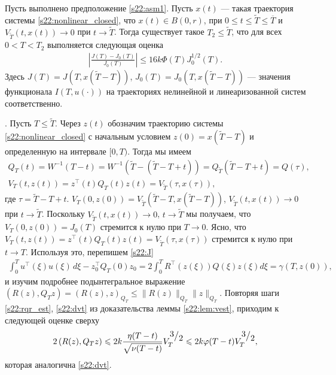 \documentclass[../main.tex]{subfiles}
\begin{document}
\begin{theorem}\label{s22:th:functional_error_estimate}
 Пусть выполнено предположение \ref{s22:asm1}. 
Пусть $x(t)$ --- такая траектория системы \eqref{s22:nonlinear_closed}, что $x(t)\in B(0,r)$, при $0\leqslant t \leqslant \tilde{T} \leqslant \overline{T} $ и $V_{\tilde{T}}(t,x(t))\to 0$ при $t\to \tilde{T}$. 
 Тогда существует такое $T_2 \leqslant \tilde{T}$, что для всех $0 < T < T_2 $ выполняется следующая оценка
 \begin{gather} \label{s22:est}
 \left| \frac{ J(T) - J_0(T)}{J_0(T)}\right| \leqslant 16k\Phi({T})J^{1/2}_0(T).
 \end{gather}
 Здесь $J(T)=J(T,x(\tilde{T}-T))$, $J_0(T)=J_0(T,x(\tilde{T}-T))$ --- значения функционала $I(T,u(\cdot))$ на траекториях нелинейной и линеаризованной систем соответственно.
\end{theorem}
\doc. 
Пусть $T\leqslant \tilde{T}$. 
Через $z(t)$ обозначим траекторию системы \eqref{s22:nonlinear_closed} с начальным условием $z(0)=x(\tilde{T}-T)$ и определенную на интервале $[0,T)$. 
Тогда мы имеем 
\begin{gather*}
Q_T(t)=W^{-1}(T-t)=W^{-1}(\tilde{T}-(\tilde{T}-T+t))=Q_{\tilde{T}}(\tilde{T}-T+t) = Q(\tau), \\ V_T(t,z(t))=z^\top(t)Q_T(t)z(t)=V_{\tilde{T}}(\tau,x(\tau)),
\end{gather*}
где $\tau=\tilde{T}-T+t$. 
$V_T(0,z(0))=V_{\tilde{T}}(\tilde{T}-T, x(\tilde{T}-T))$, $V_{\tilde{T}}(t,x(t))\to 0$ при $t\to \tilde{T}$. 
Поскольку $V_{\tilde{T}}(t,x(t))\to 0$, $t\to \tilde{T}$ мы получаем, что $V_T(0,z(0))=J_0(T)$ стремится к нулю при $T\to 0$.
Ясно, что $V_T(t,z(t))=z^\top(t)Q_T(t)z(t)=V_{\tilde{T}}(\tau,x(\tau))$ стремится к нулю при $t\to T$.
Используя это, перепишем \eqref{s22:J} 
\begin{gather}\label{s22:J1}
 \int_{0}^{T} u^{\top}(\xi) u(\xi) \, d\xi - z_0^{\top} Q_T(0)z_0= 2\int_{0}^{T} R^{\top}(z(\xi))Q(\xi) z(\xi) d\xi=\gamma(T,z(0)),
\end{gather}
и изучим подробнее подынтегральное выражение $\left( R(z), Q_T z\right)=(R(z),z)_{Q_T} \leqslant \| R(z) \|_{Q_T} \| z \|_{Q_T}$.
Повторяя шаги \eqref{s22:rqr_est}, \eqref{s22:dvt} из доказательства леммы \ref{s22:lem:vest}, приходим к следующей оценке сверху
\begin{gather}\label{s22:rqz}
 2 \left( R(z), Q_T z\right) \leqslant 2 k \frac{\eta(T-t)}{\sqrt{\nu(T-t)}}V_T^{\frc{3}{2}} \leqslant 2k \varphi(T-t) V_T^{\frc{3}{2}},
\end{gather}
которая аналогична \eqref{s22:dvt}. 
\end{document}
